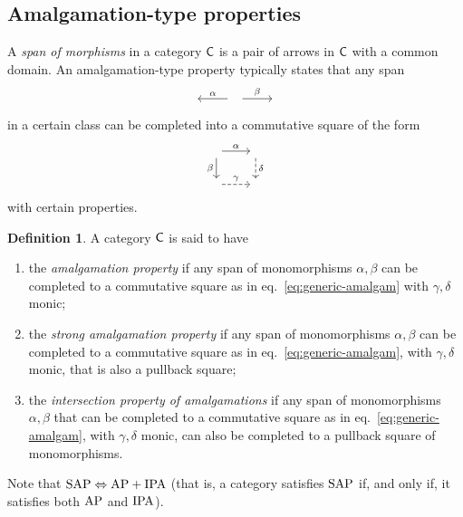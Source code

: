 \documentclass[a4paper,10pt,reqno]{amsart}
\theoremstyle{definition}
\newtheorem{definition}[theorem]{Definition}
\theoremstyle{remark}
\newcommand{\cat}{{\sf C}}								%
\newcommand{\IFF}{\Leftrightarrow}						%
\newcommand{\AP}{\textnormal{AP}}
\newcommand{\IPA}{\textnormal{IPA}}
\newcommand{\SAP}{\textnormal{SAP}}
\begin{document}
\subsection{Amalgamation-type properties}\label{s:preliminaries-amalgamation}

A \emph{span of morphisms} in a category $\cat$ is a pair of arrows in $\cat$ with a common domain.
%
 An amalgamation-type property typically states that any span
 \[\begin{tikzcd}
\phantom{\cdot} & \phantom{\cdot} \arrow{l}[swap]{\alpha} \arrow{r}{\beta} & \phantom{\cdot}
\end{tikzcd}\] 
in a certain class can be completed into a commutative square of the form
%
\begin{equation}\label{eq:generic-amalgam}
\begin{tikzcd}[cells={nodes={inner sep=2pt, outer sep=1pt}}]
\phantom{\cdot} \arrow{r}{\alpha} \arrow{d}[swap]{\beta} & \phantom{\cdot} \arrow[dashed]{d}{\delta} \\
\phantom{\cdot} \arrow[dashed]{r}{\gamma} & \phantom{\cdot}
\end{tikzcd}
\end{equation}
with certain properties.

\begin{definition}\label{d:AP-SAP-IPA}
A category $\cat$ is said to have
\begin{enumerate}
\item[(AP)]\label{AP} the \emph{amalgamation property} if any span of monomorphisms $\alpha,\beta$ can be completed to a commutative square as in eq.~\eqref{eq:generic-amalgam} with $\gamma, \delta$ monic;
\item[(SAP)]\label{SAP} the \emph{strong amalgamation property} if any span of monomorphisms $\alpha,\beta$ can be completed to a commutative square as in eq.~\eqref{eq:generic-amalgam}, with $\gamma, \delta$ monic, that is also a pullback square;
\item[(IPA)]\label{IPA} the \emph{intersection property of amalgamations} if any span of monomorphisms $\alpha,\beta$ that can be completed to a commutative square as in eq.~\eqref{eq:generic-amalgam}, with $\gamma, \delta$ monic, can also be completed to a pullback square of monomorphisms.
\end{enumerate}
\end{definition}

Note that $\SAP\IFF \AP + \IPA$ (that is, a category satisfies $\SAP$ if, and only if, it satisfies both $\AP$ and $\IPA$).
\end{document}
